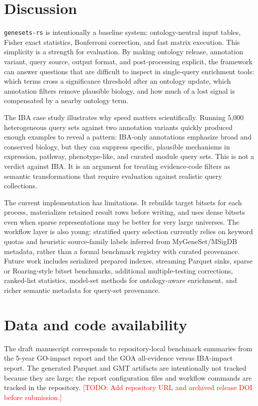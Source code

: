 \documentclass[11pt]{article}
\newcommand{\tool}{\texttt{genesets-rs}}
\newcommand{\todo}[1]{\textcolor{red}{[TODO: #1]}}
\begin{document}
\section{Discussion}

\tool{} is intentionally a baseline system: ontology-neutral input tables, Fisher exact statistics, Bonferroni correction, and fast matrix execution. This simplicity is a strength for evaluation. By making ontology release, annotation variant, query source, output format, and post-processing explicit, the framework can answer questions that are difficult to inspect in single-query enrichment tools: which terms cross a significance threshold after an ontology update, which annotation filters remove plausible biology, and how much of a lost signal is compensated by a nearby ontology term.

The IBA case study illustrates why speed matters scientifically. Running 5,000 heterogeneous query sets against two annotation variants quickly produced enough examples to reveal a pattern: IBA-only annotations emphasize broad and conserved biology, but they can suppress specific, plausible mechanisms in expression, pathway, phenotype-like, and curated module query sets. This is not a verdict against IBA. It is an argument for treating evidence-code filters as semantic transformations that require evaluation against realistic query collections.

The current implementation has limitations. It rebuilds target bitsets for each process, materializes retained result rows before writing, and uses dense bitsets even when sparse representations may be better for very large universes. The workflow layer is also young: stratified query selection currently relies on keyword quotas and heuristic source-family labels inferred from MyGeneSet/MSigDB metadata, rather than a formal benchmark registry with curated provenance. Future work includes serialized prepared indexes, streaming Parquet sinks, sparse or Roaring-style bitset benchmarks, additional multiple-testing corrections, ranked-list statistics, model-set methods for ontology-aware enrichment, and richer semantic metadata for query-set provenance.

\section{Data and code availability}

The draft manuscript corresponds to repository-local benchmark summaries from the 5-year GO-impact report and the GOA all-evidence versus IBA-impact report. The generated Parquet and GMT artifacts are intentionally not tracked because they are large; the report configuration files and workflow commands are tracked in the repository. \todo{Add repository URL and archived release DOI before submission.}
\end{document}
